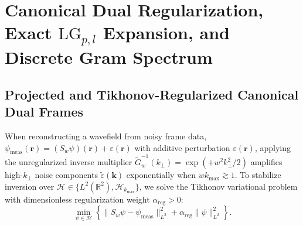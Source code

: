 \documentclass[aps,pra,reprint,nofootinbib,floatfix,longbibliography]{revtex4-2}
\theoremstyle{remark}
\newcommand{\norm}[1]{\lVert #1 \rVert}
\begin{document}
\section{Canonical Dual Regularization, Exact \texorpdfstring{$\mathrm{LG}_{p,l}$}{LG\_\{p,l\}} Expansion, and Discrete Gram Spectrum}
\label{sec:properties}

\subsection{Projected and Tikhonov-Regularized Canonical Dual Frames}
\label{subsec:tikhonov_dual}

When reconstructing a wavefield from noisy frame data, $\psi_{\mathrm{meas}}(\mathbf{r}) = (S_w\psi)(\mathbf{r}) + \varepsilon(\mathbf{r})$ with additive perturbation $\varepsilon(\mathbf{r})$, applying the unregularized inverse multiplier $\widetilde{G}_w^{-1}(k_\perp) = \exp(+w^2 k_\perp^2/2)$ amplifies high-$k_\perp$ noise components $\widetilde{\varepsilon}(\mathbf{k})$ exponentially when $w k_{\max} \gtrsim 1$. To stabilize inversion over $\mathcal{H} \in \{L^2(\mathbb{R}^2), \mathcal{H}_{k_{\max}}\}$, we solve the Tikhonov variational problem with dimensionless regularization weight $\alpha_{\mathrm{reg}} > 0$:
\begin{equation}
\min_{\psi \in \mathcal{H}} \left\{ \norm{S_w\psi - \psi_{\mathrm{meas}}}_{L^2}^2 + \alpha_{\mathrm{reg}}\norm{\psi}_{L^2}^2 \right\}.
\label{eq:tikhonov_opt}
\end{equation}
\end{document}
